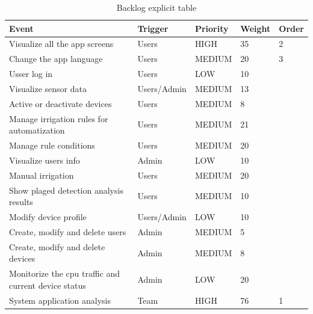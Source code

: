 \documentclass[11pt,a4paper]{article}
\begin{document}
\newpage


\begin{table}[htbp]
\begin{tabular}{|l|l|l|l|l|} 
\hline
Event                                                & Trigger     & Priority & Weight & Order \\ \hline \hline
Visualize all the app screens                        & Users       & HIGH     & 35     & 2     \\ \hline
Change the app language                              & Users       & MEDIUM   & 20     & 3     \\ \hline
Usser log in                                         & Users       & LOW      & 10     &       \\ \hline
Visualize sensor data                                & Users/Admin & MEDIUM   & 13     &       \\ \hline
Active or deactivate devices                         & Users       & MEDIUM   & 8      &       \\ \hline
Manage irrigation rules for automatization           & Users       & MEDIUM   & 21     &       \\ \hline
Manage rule conditions                               & Users       & MEDIUM   & 20     &       \\ \hline
Visualize users info                                 & Admin       & LOW      & 10     &       \\ \hline
Manual irrigation                                    & Users       & MEDIUM   & 20     &       \\ \hline
Show plaged detection analysis results               & Users       & MEDIUM   & 10     &       \\ \hline
Modify device profile                                & Users/Admin & LOW      & 10     &       \\ \hline
Create, modify and delete users                      & Admin       & MEDIUM   & 5      &       \\ \hline
Create, modify and delete devices                    & Admin       & MEDIUM   & 8      &       \\ \hline
Monitorize the cpu traffic and current device status & Admin       & LOW      & 20     &       \\ \hline
System application analysis                          & Team        & HIGH     & 76     & 1     \\ \hline
\end{tabular}
\caption{Backlog explicit table}
\end{table}
\end{document}
